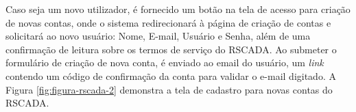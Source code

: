 Caso seja um novo utilizador, é fornecido um botão na tela de acesso para criação de novas contas, onde o sistema redirecionará à página de criação de contas e solicitará ao novo usuário: Nome, E-mail, Usuário e Senha, além de uma confirmação de leitura sobre os termos de serviço do RSCADA. Ao submeter o formulário de criação de nova conta, é enviado ao email do usuário, um \textit{link} contendo um código de confirmação da conta para validar o e-mail digitado. A Figura \ref{fig:figura-rscada-2} demonstra a tela de cadastro para novas contas do RSCADA.

        \begin{figure}[!h]
    	\end{figure}

